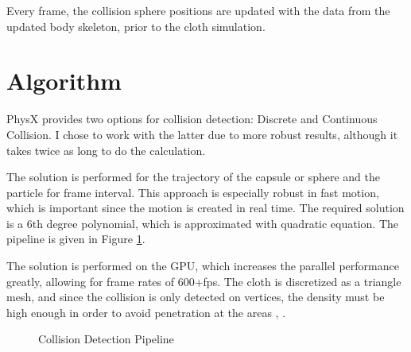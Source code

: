 Every frame, the collision sphere positions are updated with the data from the updated body skeleton, prior to the cloth simulation. 

\section{Algorithm}

PhysX provides two options for collision detection: Discrete and Continuous Collision. I chose to work with the latter due to more robust results, although it takes twice as long to do the calculation.

The solution is performed for the trajectory of the capsule or sphere and the particle for frame interval. This approach is especially robust in fast motion, which is important since the motion is created in real time. The required solution is a 6th degree polynomial, which is approximated with quadratic equation. The pipeline is given in Figure \ref{fig:collision_pipeline}.

The solution is performed on the GPU, which increases the parallel performance greatly, allowing for frame rates of 600+fps. The cloth is discretized as a triangle mesh, and since the collision is only detected on vertices, the density must be high enough in order to avoid penetration at the areas \cite{Kim2011}, \cite{Tonge2010}. 

\begin{figure}[h]
\centerline{}
\caption{Collision Detection Pipeline \cite{Tonge2010} }
\label{fig:collision_pipeline}
\end{figure}